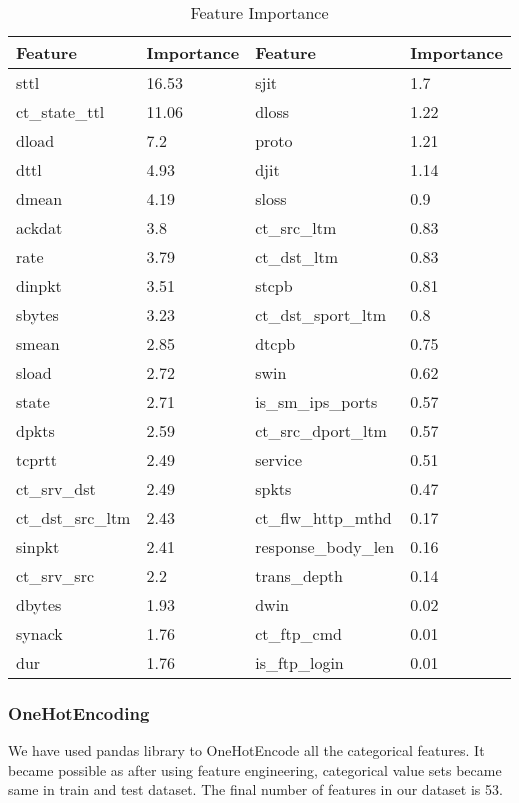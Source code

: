 \documentclass[14pt, conference]{IEEEtran}
\begin{document}
\begin{table}
\normalsize
\centering
\caption{Feature Importance}
\label{featureImportance}
\renewcommand{\arraystretch}{1.2}
\begin{tabular}{|C{2.1cm}|C{1.1cm}|C{2.5cm}|C{1.1cm}|}
\hline
\textbf{Feature} & \textbf{Importance} & \textbf{Feature} & \textbf{Importance}\\ \hline

sttl & 16.53& sjit & 1.7  \\ \hline
ct\_state\_ttl & 11.06& dloss & 1.22  \\ \hline
dload & 7.2& proto & 1.21  \\ \hline
dttl & 4.93& djit & 1.14  \\ \hline
dmean & 4.19& sloss & 0.9  \\ \hline
ackdat & 3.8& ct\_src\_ltm & 0.83  \\ \hline
rate & 3.79& ct\_dst\_ltm & 0.83  \\ \hline
dinpkt & 3.51& stcpb & 0.81  \\ \hline
sbytes & 3.23& ct\_dst\_sport\_ltm & 0.8  \\ \hline
smean & 2.85& dtcpb & 0.75  \\ \hline
sload & 2.72& swin & 0.62  \\ \hline
state & 2.71& is\_sm\_ips\_ports & 0.57  \\ \hline
dpkts & 2.59& ct\_src\_dport\_ltm & 0.57  \\ \hline
tcprtt & 2.49& service & 0.51  \\ \hline
ct\_srv\_dst & 2.49& spkts & 0.47  \\ \hline
ct\_dst\_src\_ltm & 2.43& ct\_flw\_http\_mthd & 0.17  \\ \hline
sinpkt & 2.41& response\_body\_len & 0.16  \\ \hline
ct\_srv\_src & 2.2& trans\_depth & 0.14  \\ \hline
dbytes & 1.93& dwin & 0.02  \\ \hline
synack & 1.76& ct\_ftp\_cmd & 0.01  \\ \hline
dur & 1.76& is\_ftp\_login & 0.01  \\ \hline

\end{tabular}
\end{table}


\subsubsection{OneHotEncoding}
We have used pandas library to OneHotEncode all the categorical features. It became possible as after using feature engineering, categorical value sets became same in train and test dataset. The final number of features in our dataset is 53.
\end{document}
